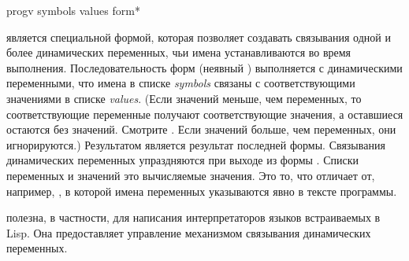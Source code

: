 \begin{defspec}
progv symbols values {form}*

 является специальной формой, которая позволяет создавать связывания
одной и более динамических переменных, чьи имена устанавливаются во время
выполнения. Последовательность форм (неявный )
выполняется с динамическими переменными, что имена в списке \emph{symbols}
связаны с соответствующими значениями в списке \emph{values}.
(Если значений меньше, чем переменных, то соответствующие переменные получают
соответствующие значения, а оставшиеся остаются без значений. Смотрите
. Если значений больше, чем переменных, они игнорируются.)
Результатом  является результат последней формы. Связывания
динамических переменных упраздняются при выходе из формы . Списки
переменных и значений это вычисляемые значения. Это то, что отличает 
от, например, , в которой имена переменных указываются явно в тексте
программы.

 полезна, в частности, для написания интерпретаторов языков
встраиваемых в Lisp. Она предоставляет управление механизмом связывания
динамических переменных.
\end{defspec}

